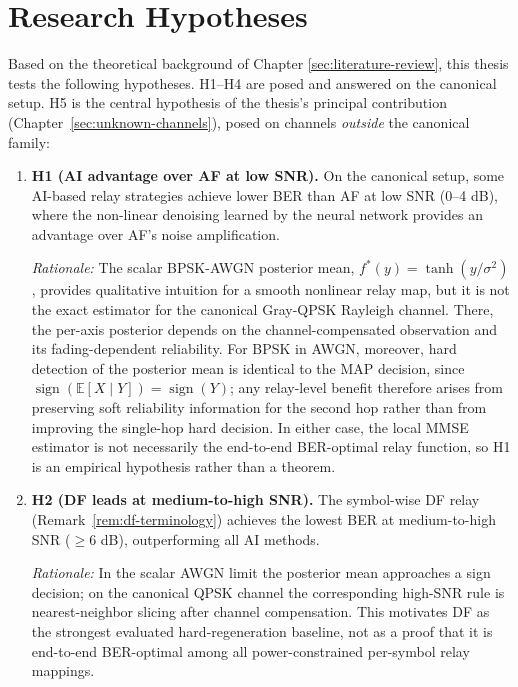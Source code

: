 \section{Research Hypotheses}\label{sec:research-hypotheses}

Based on the theoretical background of Chapter \ref{sec:literature-review}, this thesis tests the following hypotheses. H1--H4 are posed and answered on the canonical setup. H5 is the central hypothesis of the thesis's principal contribution (Chapter~\ref{sec:unknown-channels}), posed on channels \emph{outside} the canonical family:

\begin{enumerate}
    \item \textbf{H1 (AI advantage over AF at low SNR).} On the canonical setup, some AI-based relay strategies achieve lower BER than AF at low SNR (0--4 dB), where the non-linear denoising learned by the neural network provides an advantage over AF's noise amplification.

\emph{Rationale:} The scalar BPSK-AWGN posterior mean, $f^*(y)=\tanh(y/\sigma^2)$, provides qualitative intuition for a smooth nonlinear relay map, but it is not the exact estimator for the canonical Gray-QPSK Rayleigh channel. There, the per-axis posterior depends on the channel-compensated observation and its fading-dependent reliability. For BPSK in AWGN, moreover, hard detection of the posterior mean is identical to the MAP decision, since $\operatorname{sign}(\mathbb{E}[X \mid Y]) = \operatorname{sign}(Y)$; any relay-level benefit therefore arises from preserving soft reliability information for the second hop rather than from improving the single-hop hard decision. In either case, the local MMSE estimator is not necessarily the end-to-end BER-optimal relay function, so H1 is an empirical hypothesis rather than a theorem.

\item \textbf{H2 (DF leads at medium-to-high SNR).} The symbol-wise DF relay (Remark~\ref{rem:df-terminology}) achieves the lowest BER at medium-to-high SNR ($\geq 6$ dB), outperforming all AI methods.

\emph{Rationale:} In the scalar AWGN limit the posterior mean approaches a sign decision; on the canonical QPSK channel the corresponding high-SNR rule is nearest-neighbor slicing after channel compensation. This motivates DF as the strongest evaluated hard-regeneration baseline, not as a proof that it is end-to-end BER-optimal among all power-constrained per-symbol relay mappings.


\end{enumerate}
